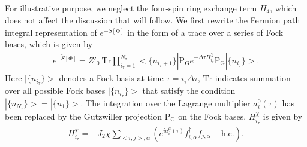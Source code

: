 \documentclass[12pt]{article}
\begin{document}
For illustrative purpose, we neglect the four-spin ring exchange term $H_{4}$, which does not affect the discussion that will follow. We first rewrite the Fermion path integral representation of $e^{-\tilde{S}[\mathrm{\Phi}]}$ in the form of a trace over a series of Fock bases, which is given by
\begin{eqnarray}
e^{-\tilde{S}[\Phi]}= Z'_{0}\  \mathrm{Tr} \prod_{i_{\tau}=1}^{N_{\tau}}<\{n_{i_{\tau}+1}\}|\mathrm{P_{G}}e^{-\Delta\tau H^{\chi}_{i_{\tau}}}\mathrm{P_{G}}|\{n_{i_{\tau}}\}>.\nonumber
\end{eqnarray}
Here $|\{n_{i_{\tau}}\}>$ denotes a Fock basis at time $\tau=i_{\tau}\Delta\tau$, $\mathrm{Tr}$ indicates summation over all possible Fock bases $|\{n_{i_{\tau}}\}>$ that satisfy the condition $|\{n_{N_{\tau}}\}>=|\{n_{1}\}>$. The integration over the Lagrange multiplier $a^{0}_{i}(\tau)$ has been replaced by the Gutzwiller projection $\mathrm{P_{G}}$ on the Fock bases. $H^{\chi}_{i_{\tau}}$ is given by 
\begin{eqnarray}
H^{\chi}_{i_{\tau}}=-J_{2}\chi\sum_{<i,j>,\alpha}(e^{ia^{\mu}_{i}(\tau)}f^{\dagger}_{i,\alpha}f_{j,\alpha}+\mathrm{h.c.}).\nonumber
\end{eqnarray}
\end{document}
